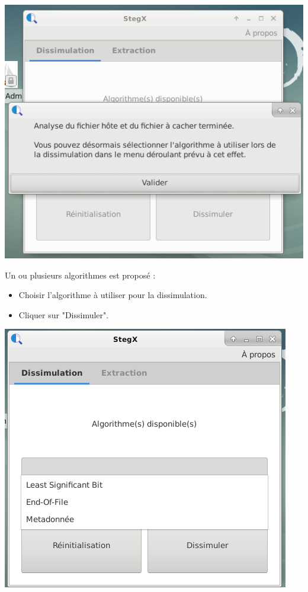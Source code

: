 \documentclass[11pt]{article}
\begin{document}
\vspace{0.5cm}
\hspace{2cm}
\includegraphics[scale=0.8]{pictures/insertion_2.png}
\vspace{1cm}

Un ou plusieurs algorithmes est proposé : 
\begin{itemize}
\item Choisir l'algorithme à utiliser pour la dissimulation.
\item Cliquer sur "Dissimuler". 
\end{itemize}

\vspace{0.5cm}
\hspace{2cm}
\includegraphics[scale=0.8]{pictures/insertion_3.png}
\vspace{1cm}
\end{document}
